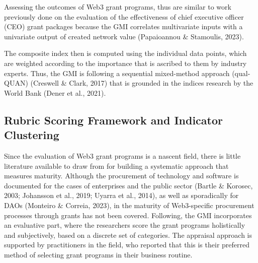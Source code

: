 \documentclass[conference]{IEEEtran}
\begin{document}
Assessing the outcomes of Web3 grant programs, thus are similar to work previously done on the evaluation of the effectiveness of chief executive officer (CEO) grant packages because the GMI correlates multivariate inputs with a univariate output of created network value (Papaioannou \& Stamoulis, 2023).

The composite index then is computed using the individual data points, which are weighted according to the importance that is ascribed to them by industry experts. Thus, the GMI is following a sequential mixed-method approach (qual-QUAN) (Creswell \& Clark, 2017) that is grounded in the indices research by the World Bank (Dener et al., 2021).




\subsection{Rubric Scoring Framework and Indicator Clustering}

Since the evaluation of Web3 grant programs is a nascent field, there is little literature available to draw from for building a systematic approach that measures maturity. Although the procurement of technology and software is documented for the cases of enterprises and the public sector (Bartle \& Korosec, 2003; Johansson et al., 2019; Uyarra et al., 2014), as well as sporadically for DAOs (Monteiro \& Correia, 2023), in the maturity of Web3-specific procurement processes through grants has not been covered. Following, the GMI incorporates an evaluative part, where the researchers score the grant programs holistically and subjectively, based on a discrete set of categories. The appraisal approach is supported by practitioners in the field, who reported that this is their preferred method of selecting grant programs in their business routine.
\end{document}
